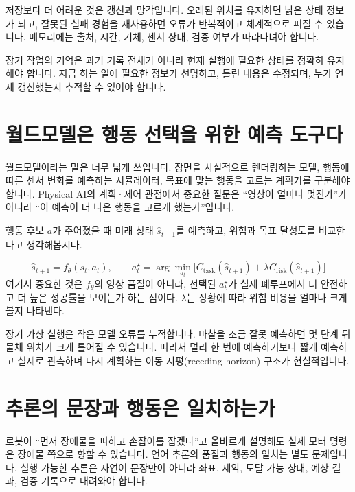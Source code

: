 \documentclass[11pt,openany]{book}
\begin{document}
저장보다 더 어려운 것은 갱신과 망각입니다. 오래된 위치를 유지하면 낡은 상태 정보가 되고, 잘못된 실패 경험을 재사용하면 오류가 반복적이고 체계적으로 퍼질 수 있습니다. 메모리에는 출처, 시간, 기체, 센서 상태, 검증 여부가 따라다녀야 합니다.

\begin{profbox}
장기 작업의 기억은 과거 기록 전체가 아니라 현재 실행에 필요한 상태를 정확히 유지해야 합니다. 지금 하는 일에 필요한 정보가 선명하고, 틀린 내용은 수정되며, 누가 언제 갱신했는지 추적할 수 있어야 합니다.
\end{profbox}

\section{월드모델은 행동 선택을 위한 예측 도구다}

월드모델이라는 말은 너무 넓게 쓰입니다. 장면을 사실적으로 렌더링하는 모델, 행동에 따른 센서 변화를 예측하는 시뮬레이터, 목표에 맞는 행동을 고르는 계획기를 구분해야 합니다. Physical AI의 계획·제어 관점에서 중요한 질문은 ``영상이 얼마나 멋진가''가 아니라 ``이 예측이 더 나은 행동을 고르게 했는가''입니다.

행동 후보 \(a\)가 주어졌을 때 미래 상태 \(\hat{s}_{t+1}\)를 예측하고, 위험과 목표 달성도를 비교한다고 생각해봅시다.

\begin{boardbox}
\[
\hat{s}_{t+1}=f_\theta(s_t,a_t), \qquad
a_t^\star=\arg\min_{a_t}\bigl[
C_{\mathrm{task}}(\hat{s}_{t+1})+
\lambda C_{\mathrm{risk}}(\hat{s}_{t+1})
\bigr]
\]
\small
여기서 중요한 것은 \(f_\theta\)의 영상 품질이 아니라, 선택된 \(a_t^\star\)가 실제 폐루프에서 더 안전하고 더 높은 성공률을 보이는가 하는 점이다. \(\lambda\)는 상황에 따라 위험 비용을 얼마나 크게 볼지 나타낸다.
\end{boardbox}

장기 가상 실행은 작은 모델 오류를 누적합니다. 마찰을 조금 잘못 예측하면 몇 단계 뒤 물체 위치가 크게 틀어질 수 있습니다. 따라서 멀리 한 번에 예측하기보다 짧게 예측하고 실제로 관측하며 다시 계획하는 이동 지평(receding-horizon) 구조가 현실적입니다.

\section{추론의 문장과 행동은 일치하는가}

로봇이 ``먼저 장애물을 피하고 손잡이를 잡겠다''고 올바르게 설명해도 실제 모터 명령은 장애물 쪽으로 향할 수 있습니다. 언어 추론의 품질과 행동의 일치는 별도 문제입니다. 실행 가능한 추론은 자연어 문장만이 아니라 좌표, 제약, 도달 가능 상태, 예상 결과, 검증 기록으로 내려와야 합니다.
\end{document}
